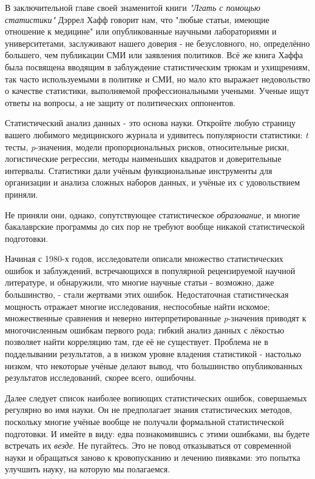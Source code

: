 В заключительной главе своей знаменитой книги \emph{"Лгать с помощью статистики"} Дэррел Хафф говорит нам, что "любые статьи, имеющие отношение к медицине" или опубликованные научными лабораториями и университетами, заслуживают нашего доверия - не безусловного, но, определённо большего, чем публикации СМИ или заявления политиков. Всё же книга Хаффа была посвящена вводящим в заблуждение статистическим трюкам и ухищрениям, так часто используемыми в политике и СМИ, но мало кто выражает недовольство о качестве статистики, выполняемой профессиональными учеными. Ученые ищут ответы на вопросы, а не защиту от политических оппонентов.

Статистический анализ данных - это основа науки. Откройте любую страницу вашего любимого медицинского журнала и удивитесь популярности статистики: \emph{t} тесты, \emph{p}-значения, модели пропорциональных рисков, относительные риски, логистические регрессии, методы наименьших квадратов и доверительные интервалы. Статистики дали учёным функциональные инструменты для организации и анализа сложных наборов данных, и учёные их с удовольствием приняли.
 
Не приняли они, однако, сопутствующее статистическое \emph{образование}, и многие бакалаврские программы до сих пор не требуют вообще никакой статистической подготовки.

Начиная с 1980-х годов, исследователи описали множество статистических ошибок и заблуждений, встречающихся в популярной рецензируемой научной литературе, и обнаружили, что многие научные статьи - возможно, даже большинство, - стали жертвами этих ошибок. Недостаточная статистическая мощность отражает многие исследования, неспособные найти искомое; множественные сравнения и неверно интерпретированные \emph{p}-значения приводят к многочисленным ошибкам первого рода; гибкий анализ данных с лёкостью позволяет найти корреляцию там, где её не существует. Проблема не в подделывании результатов, а в низком уровне владения статистикой - настолько низком, что некоторые учёные делают вывод, что большинство опубликованных результатов исследований, скорее всего, ошибочны.\cite{ioannidis_why_2005}

Далее следует список наиболее вопиющих статистических ошибок, совершаемых регулярно во имя науки. Он не предполагает знания статистических методов, поскольку многие учёные вообще не получали формальной статистической подготовки. И имейте в виду: едва познакомившись с этими ошибками, вы будете встречать их \emph{везде}. Не пугайтесь. Это не повод отказываться от современной науки и обращаться заново к кровопусканию и лечению пиявками: это попытка улучшить науку, на которую мы полагаемся.
 

